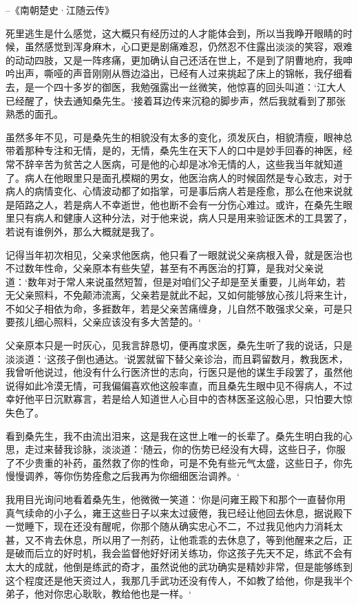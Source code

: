 --《南朝楚史·江随云传》

死里逃生是什么感觉，这大概只有经历过的人才能体会到，所以当我睁开眼睛的时候，虽然感觉到浑身麻木，心口更是剧痛难忍，仍然忍不住露出淡淡的笑容，艰难的动动四肢，又是一阵疼痛，更加确认自己还活在世上，不是到了阴曹地府，我呻吟出声，嘶哑的声音刚刚从唇边溢出，已经有人过来挑起了床上的锦帐，我仔细看去，是一个四十多岁的御医，我勉强露出一丝微笑，他惊喜的回头叫道：‘江大人已经醒了，快去通知桑先生。‘接着耳边传来沉稳的脚步声，然后我就看到了那张熟悉的面孔。

虽然多年不见，可是桑先生的相貌没有太多的变化，须发灰白，相貌清瘦，眼神总带着那种专注和无情，是的，无情，桑先生在天下人的口中是妙手回春的神医，经常不辞辛苦为贫苦之人医病，可是他的心却是冰冷无情的人，这些我当年就知道了。病人在他眼里只是面孔模糊的男女，他医治病人的时候固然是专心致志，对于病人的病情变化、心情波动都了如指掌，可是事后病人若是痊愈，那么在他来说就是陌路之人，若是病人不幸逝世，他也断不会有一分伤心难过。或许，在桑先生眼里只有病人和健康人这种分法，对于他来说，病人只是用来验证医术的工具罢了，若说有谁例外，那么大概就是我了。

记得当年初次相见，父亲求他医病，他只看了一眼就说父亲病根入骨，就是医治也不过数年性命，父亲原本有些失望，甚至有不再医治的打算，是我对父亲说道：‘数年对于常人来说虽然短暂，但是对咱们父子却是至关重要，儿尚年幼，若无父亲照料，不免颠沛流离，父亲若是就此不起，又如何能够放心孩儿将来生计，不如父子相依为命，多捱数年，若是父亲苦痛缠身，儿自然不敢强求父亲，可是只要孩儿细心照料，父亲应该没有多大苦楚的。‘

父亲原本只是一时灰心，见我言辞恳切，便再度求医，桑先生听了我的说话，只是淡淡道：‘这孩子倒也通达。‘说罢就留下替父亲诊治，而且羁留数月，教我医术，我曾听他说过，他没有什么行医济世的志向，行医只是他的谋生手段罢了，虽然他说得如此冷漠无情，可我偏偏喜欢他这般率直，而且桑先生眼中见不得病人，不过幸好他平日沉默寡言，若是给人知道世人心目中的杏林医圣这般心思，只怕要大惊失色了。

看到桑先生，我不由流出泪来，这是我在这世上唯一的长辈了。桑先生明白我的心思，走过来替我诊脉，淡淡道：‘随云，你的伤势已经没有大碍，这些日子，你服了不少贵重的补药，虽然救了你的性命，可是不免有些元气太盛，这些日子，你先慢慢调养，等你伤势痊愈之后我再为你细细医治调养。‘

我用目光询问地看着桑先生，他微微一笑道：‘你是问雍王殿下和那个一直替你用真气续命的小子么，雍王这些日子以来太过疲倦，我已经让他回去休息，据说殿下一觉睡下，现在还没有醒呢，你那个随从确实忠心不二，不过我见他内力消耗太甚，又不肯去休息，所以用了一剂药，让他乖乖的去休息了，等到他醒来之后，正是破而后立的好时机，我会监督他好好闭关练功，你这孩子先天不足，练武不会有太大的成就，他倒是练武的奇才，虽然说他的武功确实是精妙非常，但是能够练到这个程度还是他天资过人，我那几手武功还没有传人，不如教了给他，你是我半个弟子，他对你忠心耿耿，教给他也是一样。‘

